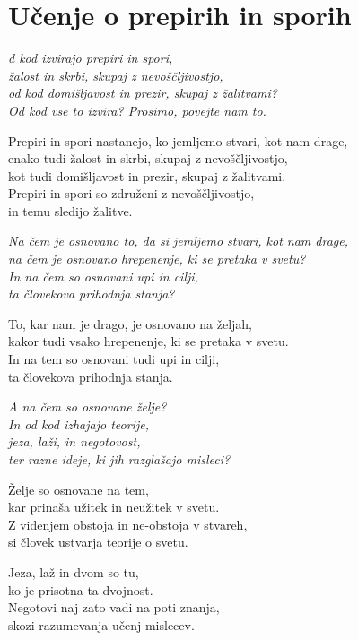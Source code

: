 \cleartorecto
{}
\chapter{Učenje o prepirih in sporih}

\emph{d kod izvirajo prepiri in spori,\\
žalost in skrbi, skupaj z nevoščljivostjo,\\
od kod domišljavost in prezir, skupaj z žalitvami?\\
Od kod vse to izvira? Prosimo, povejte nam to.}

Prepiri in spori nastanejo, ko jemljemo stvari, kot nam drage,\\
enako tudi žalost in skrbi, skupaj z nevoščljivostjo,\\
kot tudi domišljavost in prezir, skupaj z žalitvami.\\
Prepiri in spori so združeni z nevoščljivostjo,\\
in temu sledijo žalitve.

\clearpage

\emph{Na čem je osnovano to, da si jemljemo stvari, kot nam drage,}\\
\emph{na čem je osnovano hrepenenje, ki se pretaka v svetu?}\\
\emph{In na čem so osnovani upi in cilji,}\\
\emph{ta človekova prihodnja stanja?}

To, kar nam je drago, je osnovano na željah,\\
kakor tudi vsako hrepenenje, ki se pretaka v svetu.\\
In na tem so osnovani tudi upi in cilji,\\
ta človekova prihodnja stanja.

\emph{A na čem so osnovane želje?}\\
\emph{In od kod izhajajo teorije,}\\
\emph{jeza, laži, in negotovost,}\\
\emph{ter razne ideje, ki jih razglašajo misleci?}

Želje so osnovane na tem,\\
kar prinaša užitek in neužitek v svetu.\\
Z videnjem obstoja in ne-obstoja v stvareh,\\
si človek ustvarja teorije o svetu.

Jeza, laž in dvom so tu,\\
ko je prisotna ta dvojnost.\\
Negotovi naj zato vadi na poti znanja,\\
skozi razumevanja učenj mislecev.

